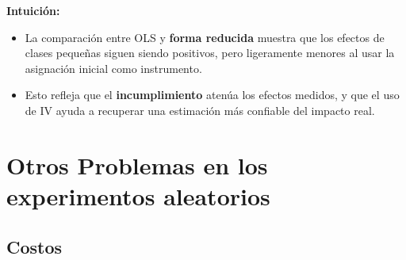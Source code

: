 \documentclass[12pt]{article}
\begin{document}
\textbf{Intuición:}
\begin{itemize}
    \item La comparación entre OLS y \textbf{forma reducida} muestra que los efectos de clases pequeñas siguen siendo positivos, pero ligeramente menores al usar la asignación inicial como instrumento.
    \item Esto refleja que el \textbf{incumplimiento} atenúa los efectos medidos, y que el uso de IV ayuda a recuperar una estimación más confiable del impacto real.
\end{itemize}

\section*{\noindent\textbf{Otros Problemas en los experimentos aleatorios}}

\subsection*{\noindent\textbf{Costos}}
\end{document}
